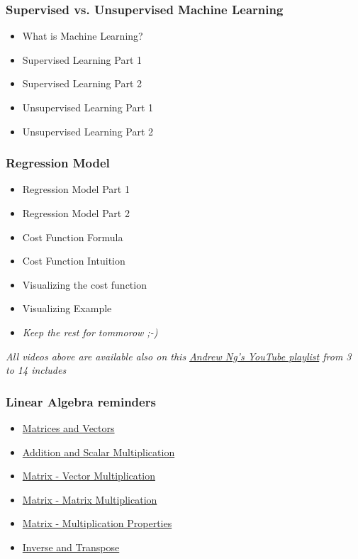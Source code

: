 \subsubsection*{Supervised vs. Unsupervised Machine Learning}
\begin{itemize}
    \item What is Machine Learning?
    \item Supervised Learning Part 1
    \item Supervised Learning Part 2
    \item Unsupervised Learning Part 1
    \item Unsupervised Learning Part 2
\end{itemize}
    
\subsubsection*{Regression Model}  
\begin{itemize}
    \item Regression Model Part 1
    \item Regression Model Part 2
    \item Cost Function Formula
    \item Cost Function Intuition
    \item Visualizing the cost function
    \item Visualizing Example
    \item \textit{Keep the rest for tommorow ;-)}
\end{itemize}

\emph{All videos above are available also on this \href{https://youtube.com/playlist?list=PLkDaE6sCZn6FNC6YRfRQc_FbeQrF8BwGI&feature=shared}{Andrew Ng's YouTube playlist} from 3 to 14 includes}

\subsubsection*{Linear Algebra reminders}
\begin{itemize}
    \item \href{https://www.youtube.com/watch?v=XMB__E658fQ}{Matrices and Vectors}
    \item \href{https://www.youtube.com/watch?v=k1JGJhUGmBE}{Addition and Scalar Multiplication}
    \item \href{https://www.youtube.com/watch?v=VIfykceJoZI}{Matrix - Vector Multiplication}
    \item \href{https://www.youtube.com/watch?v=JHZKyt0m1kc}{Matrix - Matrix Multiplication}
    \item \href{https://www.youtube.com/watch?v=wqM7O_ZUtCc}{Matrix - Multiplication Properties}
    \item \href{https://www.youtube.com/watch?v=IUf8HDyUeY0}{Inverse and Transpose}
\end{itemize}
